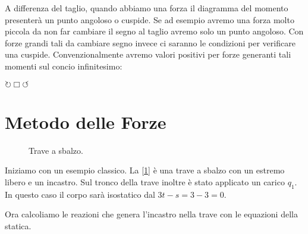 \documentclass[a4paper,12pt, oneside]{book}
\begin{document}
	A differenza del taglio, quando abbiamo una forza il diagramma del  momento presenterà un punto angoloso o cuspide. 
	Se ad esempio avremo una forza molto piccola da non far cambiare il segno al taglio avremo solo un punto angoloso.
	Con forze grandi tali da cambiare segno invece ci saranno le condizioni per verificare una cuspide.
	Convenzionalmente avremo valori positivi per forze generanti tali  momenti sul concio infinitesimo:
	
	\centering $\circlearrowright \Box \circlearrowleft$
	
	\section{Metodo delle Forze}
	
	\begin{figure}[H]
		\centering
		\caption{Trave a sbalzo.}
		\label{fig:sbalzouno}
	\end{figure}
	
	Iniziamo con un esempio classico. La [\ref{fig:sbalzouno}] è una trave a sbalzo con un estremo libero e un incastro. Sul tronco della trave inoltre è stato applicato un carico $q_1$. In questo caso il corpo sarà isostatico dal $3t-s=3-3=0$.
	
	Ora calcoliamo le reazioni che genera l'incastro nella trave con le equazioni della statica.
	
\end{document}

